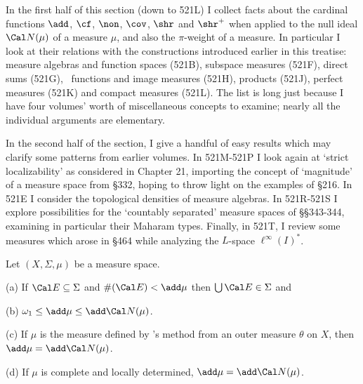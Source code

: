 \discrpage 
 
 

\def\chaptername{Cardinal functions of measure theory}
\def\sectionname{Basic theory}




In the first half of this section (down to 521L) I collect facts
about the cardinal
functions $\add$, $\cf$, $\non$, $\cov$, $\shr$ and $\shr^+$ when applied
to the null ideal $\Cal N(\mu)$ of a measure $\mu$, and also the
$\pi$-weight of a measure.
In particular I look at their relations with the
constructions introduced earlier in this treatise:
measure algebras and function
spaces (521B), subspace measures (521F), direct sums (521G), \imp\
functions and image measures (521H), products (521J), perfect measures
(521K) and compact measures (521L).   The list is long just because I
have four volumes' worth of miscellaneous concepts to examine;  nearly all
the individual arguments are elementary.

In the second half of the section, I give
a handful of easy results which may clarify some
patterns from earlier volumes.   In 521M-521P %
I look again at `strict localizability' as considered in Chapter 21,
importing the concept of `magnitude' of a measure space from \S332,
hoping to throw light on the examples of \S216.
In 521E I consider the topological densities of measure algebras.
In 521R-521S I
explore possibilities for the `countably separated' measure spaces of
\S\S343-344, examining in particular their Maharam types.   Finally,
in 521T, I review some measures which arose in \S464 while analyzing the
$L$-space $\ell^{\infty}(I)^*$.

 Let $(X,\Sigma,\mu)$ be a measure space.

(a) If $\Cal E\subseteq\Sigma$ and $\#(\Cal E)<\add\mu$ then
$\bigcup\Cal E\in\Sigma$ and


(b) $\omega_1\le\add\mu\le\add\Cal N(\mu)$.

(c) If $\mu$ is the measure defined by \Caratheodory's method from
an outer measure $\theta$ on $X$, then $\add\mu=\add\Cal N(\mu)$.

(d) If $\mu$ is complete and locally determined,
$\add\mu=\add\Cal N(\mu)$.

